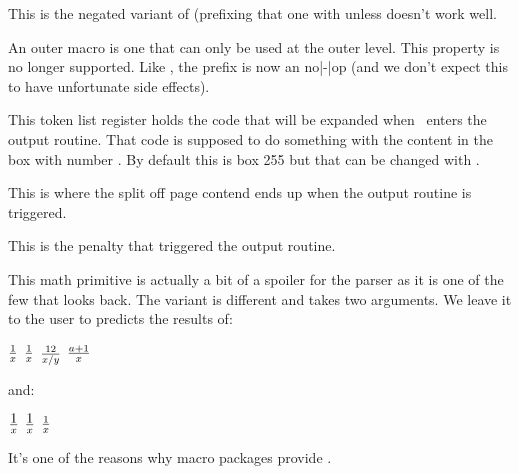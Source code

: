 \stopnewprimitive

\startnewprimitive[title={\prm {orunless}}]

This is the negated variant of  (prefixing that one with \tex
{unless} doesn't work well.

\stopnewprimitive

\startoldprimitive[title={\prm {outer}}][obsolete=yes]

An outer macro is one that can only be used at the outer level. This property is
no longer supported. Like , the  prefix is now an
no|-|op (and we don't expect this to have unfortunate side effects).

\stopoldprimitive

\startoldprimitive[title={\prm {output}}]

This token list register holds the code that will be expanded when \TEX\ enters
the output routine. That code is supposed to do something with the content in
the box with number . By default this is box 255 but that can be
changed with .

\stopoldprimitive

\startnewprimitive[title={\prm {outputbox}}]

This is where the split off page contend ends up when the output routine is
triggered.

\stopnewprimitive

\startoldprimitive[title={\prm {outputpenalty}}]

This is the penalty that triggered the output routine.

\stopoldprimitive

\startoldprimitive[title={\prm {over}}][obsolete=yes]

This math primitive is actually a bit of a spoiler for the parser as it is one of
the few that looks back. The  variant is different and takes two
arguments. We leave it to the user to predicts the results of:

\starttyping
$    {1} \over {x}    $
$     1  \over  x     $
$    12  \over  x / y $
$ a + 1  \over {x}    $
\stoptyping

and:

\starttyping
$  \textstyle 1  \over x  $
$ {\textstyle 1} \over x  $
$  \textstyle {1 \over x} $
\stoptyping

It's one of the reasons why macro packages provide \type {\frac}.

\stopoldprimitive

